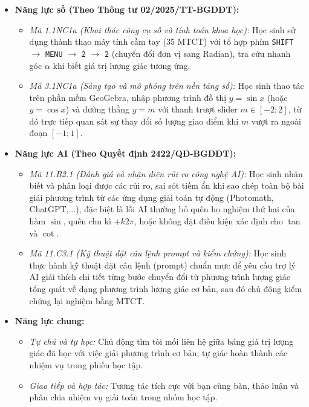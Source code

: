 \documentclass[12pt, a4paper]{article}
\begin{document}
\begin{itemize}[leftmargin=1.2cm]
    \item \textbf{Năng lực số (Theo Thông tư 02/2025/TT-BGDĐT):}  
    \begin{itemize}[leftmargin=0.6cm]  
        \item \textit{Mã 1.1NC1a (Khai thác công cụ số và tính toán khoa học):} Học sinh sử dụng thành thạo máy tính cầm tay (35 MTCT) với tổ hợp phím \texttt{SHIFT} $\to$ \texttt{MENU} $\to$ \texttt{2} $\to$ \texttt{2} (chuyển đổi đơn vị sang Radian), tra cứu nhanh góc $\alpha$ khi biết giá trị lượng giác tương ứng.  
        \item \textit{Mã 3.1NC1a (Sáng tạo và mô phỏng trên nền tảng số):} Học sinh thao tác trên phần mềm GeoGebra, nhập phương trình đồ thị $y = \sin x$ (hoặc $y = \cos x$) và đường thẳng $y = m$ với thanh trượt slider $m \in [-2; 2]$, từ đó trực tiếp quan sát sự thay đổi số lượng giao điểm khi $m$ vượt ra ngoài đoạn $[-1; 1]$.  
    \end{itemize}  
  
    \item \textbf{Năng lực AI (Theo Quyết định 2422/QĐ-BGDĐT):}  
    \begin{itemize}[leftmargin=0.6cm]  
        \item \textit{Mã 11.B2.1 (Đánh giá và nhận diện rủi ro công nghệ AI):} Học sinh nhận biết và phân loại được các rủi ro, sai sót tiềm ẩn khi sao chép toàn bộ bài giải phương trình từ các ứng dụng giải toán tự động (Photomath, ChatGPT,...), đặc biệt là lỗi AI thường bỏ quên họ nghiệm thứ hai của hàm $\sin$, quên chu kì $+ k2\pi$, hoặc không đặt điều kiện xác định cho $\tan$ và $\cot$.  
        \item \textit{Mã 11.C3.1 (Kỹ thuật đặt câu lệnh prompt và kiểm chứng):} Học sinh thực hành kỹ thuật đặt câu lệnh (prompt) chuẩn mực để yêu cầu trợ lý AI giải thích chi tiết từng bước chuyển đổi từ phương trình lượng giác tổng quát về dạng phương trình lượng giác cơ bản, sau đó chủ động kiểm chứng lại nghiệm bằng MTCT.  
    \end{itemize}  
  
    \item \textbf{Năng lực chung:}  
    \begin{itemize}[leftmargin=0.6cm]  
        \item \textit{Tự chủ và tự học:} Chủ động tìm tòi mối liên hệ giữa bảng giá trị lượng giác đã học với việc giải phương trình cơ bản; tự giác hoàn thành các nhiệm vụ trong phiếu học tập.  
        \item \textit{Giao tiếp và hợp tác:} Tương tác tích cực với bạn cùng bàn, thảo luận và phân chia nhiệm vụ giải toán trong nhóm học tập.  
    \end{itemize}  
\end{itemize}  
  
\end{document}
